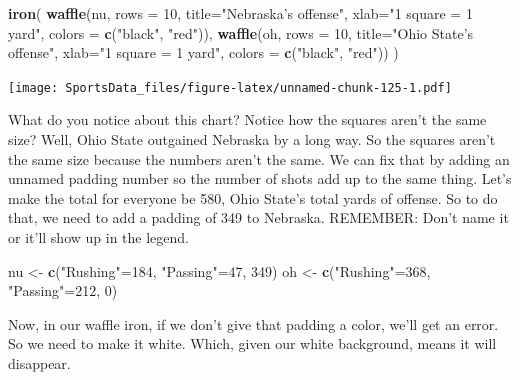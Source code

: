 \documentclass[]{book}
\newenvironment{Shaded}{\begin{snugshade}}{\end{snugshade}}
\newcommand{\DataTypeTok}[1]{\textcolor[rgb]{0.13,0.29,0.53}{#1}}
\newcommand{\DecValTok}[1]{\textcolor[rgb]{0.00,0.00,0.81}{#1}}
\newcommand{\KeywordTok}[1]{\textcolor[rgb]{0.13,0.29,0.53}{\textbf{#1}}}
\newcommand{\NormalTok}[1]{#1}
\newcommand{\StringTok}[1]{\textcolor[rgb]{0.31,0.60,0.02}{#1}}
\begin{document}
\begin{Shaded}
\begin{Highlighting}[]
\KeywordTok{iron}\NormalTok{(}
 \KeywordTok{waffle}\NormalTok{(nu, }\DataTypeTok{rows =} \DecValTok{10}\NormalTok{, }\DataTypeTok{title=}\StringTok{"Nebraska's offense"}\NormalTok{, }\DataTypeTok{xlab=}\StringTok{"1 square = 1 yard"}\NormalTok{, }\DataTypeTok{colors =} \KeywordTok{c}\NormalTok{(}\StringTok{"black"}\NormalTok{, }\StringTok{"red"}\NormalTok{)),}
 \KeywordTok{waffle}\NormalTok{(oh, }\DataTypeTok{rows =} \DecValTok{10}\NormalTok{, }\DataTypeTok{title=}\StringTok{"Ohio State's offense"}\NormalTok{, }\DataTypeTok{xlab=}\StringTok{"1 square = 1 yard"}\NormalTok{, }\DataTypeTok{colors =} \KeywordTok{c}\NormalTok{(}\StringTok{"black"}\NormalTok{, }\StringTok{"red"}\NormalTok{))}
\NormalTok{)}
\end{Highlighting}
\end{Shaded}

\texttt{[image: SportsData\_files/figure-latex/unnamed-chunk-125-1.pdf]}

What do you notice about this chart? Notice how the squares aren't the same size? Well, Ohio State outgained Nebraska by a long way. So the squares aren't the same size because the numbers aren't the same. We can fix that by adding an unnamed padding number so the number of shots add up to the same thing. Let's make the total for everyone be 580, Ohio State's total yards of offense. So to do that, we need to add a padding of 349 to Nebraska. REMEMBER: Don't name it or it'll show up in the legend.

\begin{Shaded}
\begin{Highlighting}[]
\NormalTok{nu <-}\StringTok{ }\KeywordTok{c}\NormalTok{(}\StringTok{"Rushing"}\NormalTok{=}\DecValTok{184}\NormalTok{, }\StringTok{"Passing"}\NormalTok{=}\DecValTok{47}\NormalTok{, }\DecValTok{349}\NormalTok{)}
\NormalTok{oh <-}\StringTok{ }\KeywordTok{c}\NormalTok{(}\StringTok{"Rushing"}\NormalTok{=}\DecValTok{368}\NormalTok{, }\StringTok{"Passing"}\NormalTok{=}\DecValTok{212}\NormalTok{, }\DecValTok{0}\NormalTok{)}
\end{Highlighting}
\end{Shaded}

Now, in our waffle iron, if we don't give that padding a color, we'll get an error. So we need to make it white. Which, given our white background, means it will disappear.
\end{document}
